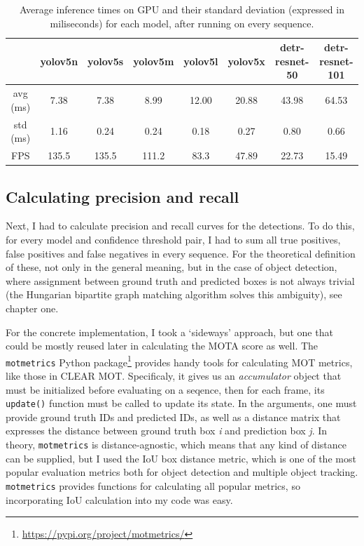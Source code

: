 \begin{table}[h]
    \begin{tabular}{|c|c|c|c|c|c|c|c|}
        \hline
         & yolov5n & yolov5s & yolov5m & yolov5l & yolov5x & detr-resnet-50 & detr-resnet-101 \\
        \hline
        \hline
        avg (ms) & 7.38 & 7.38 & 8.99 & 12.00 & 20.88 & 43.98 & 64.53 \\
        \hline
        std (ms) & 1.16 & 0.24 & 0.24 & 0.18 & 0.27 & 0.80 & 0.66 \\
        \hline
        \hline
            FPS & 135.5 & 135.5 & 111.2 & 83.3 & 47.89 & 22.73 & 15.49 \\
        \hline
    \end{tabular}
    \caption{Average inference times on GPU and their standard deviation (expressed in miliseconds) for each model, after running on every sequence.}
    \label{tab:inference-times}
\end{table}

\begin{figure}[h]
    
\end{figure}

\subsection{Calculating precision and recall}

Next, I had to calculate precision and recall curves for the detections. To do this, for every model and confidence threshold pair, I had to sum all true positives, false positives and false negatives in every sequence. For the theoretical definition of these, not only in the general meaning, but in the case of object detection, where assignment between ground truth and predicted boxes is not always trivial (the Hungarian bipartite graph matching algorithm solves this ambiguity), see chapter one.

For the concrete implementation, I took a `sideways' approach, but one that could be mostly reused later in calculating the MOTA score as well. The \verb|motmetrics| Python package\footnote{\url{https://pypi.org/project/motmetrics/}} provides handy tools for calculating MOT metrics, like those in CLEAR MOT. Specificaly, it gives us an \textit{accumulator} object that must be initialized before evaluating on a seqence, then for each frame, its \verb|update()| function must be called to update its state. In the arguments, one must provide ground truth IDs and predicted IDs, as well as a distance matrix that expresses the distance between ground truth box \textit{i} and prediction box \textit{j}. In theory, \verb|motmetrics| is distance-agnostic, which means that any kind of distance can be supplied, but I used the IoU box distance metric, which is one of the most popular evaluation metrics both for object detection and multiple object tracking. \verb|motmetrics| provides functions for calculating all popular metrics, so incorporating IoU calculation into my code was easy.

